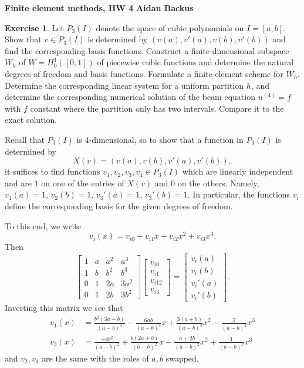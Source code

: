 \documentclass[10pt]{article}
\theoremstyle{definition}
\newtheorem{exer}{Exercise}
\begin{document}
\noindent
\large\textbf{Finite element methods, HW 4} \hfill \textbf{Aidan Backus} \\

\begin{exer}
Let $P_3(I)$ denote the space of cubic polynomials on $I = [a, b]$.
Show that $v \in P_3(I)$ is determined by $(v(a), v'(a), v(b), v'(b))$ and find the corresponding basis functions.
Construct a finite-dimensional subspace $W_h$ of $W = H^1_0([0, 1])$ of piecewise cubic functions and determine the natural degrees of freedom and basis functions.
Formulate a finite-element scheme for $W_h$.
Determine the corresponding linear system for a uniform partition $h$, and determine the corresponding numerical solution of the beam equation $u^{(4)} = f$ with $f$ constant where the partition only has two intervals.
Compare it to the exact solution.
\end{exer}

Recall that $P_3(I)$ is $4$-dimensional, so to show that a function in $P_3(I)$ is determined by
$$X(v) = (v(a), v(b), v'(a), v'(b)),$$
it suffices to find functions $v_1, v_2, v_3, v_4 \in P_3(I)$ which are linearly independent and are $1$ on one of the entries of $X(v)$ and $0$ on the others. Namely, $v_1(a) = 1$, $v_2(b) = 1$, $v_3'(a) = 1$, $v_3'(b) = 1$.
In particular, the functions $v_i$ define the corresponding basis for the given degrees of freedom.

To this end, we write 
$$v_i(x) = v_{i0} + v_{i1}x + v_{i2}x^2 + v_{i3}x^3.$$
Then
$$\begin{bmatrix} 1 & a & a^2 & a^3 \\ 1 & b & b^2 & b^3 \\ 0 & 1 & 2a & 3a^2 \\ 0 & 1 & 2b & 3b^2 \end{bmatrix}\begin{bmatrix}v_{i0} \\ v_{i1} \\ v_{i12} \\ v_{i3}\end{bmatrix} = \begin{bmatrix}v_i(a) \\ v_i(b) \\ v_i'(a) \\ v_i'(b)\end{bmatrix}.$$
Inverting this matrix we see that 
\begin{align*}
    v_1(x) &= \frac{b^2(3a - b)}{(a - b)^3} - \frac{6ab}{(a - b)^3}x + \frac{3(a + b)}{(a - b)^3}x^2 - \frac{2}{(a - b)^3}x^3\\
    v_3(x) &= \frac{-ab^2}{(a - b)^2} + \frac{b(2a + b)}{(a - b)^2}x - \frac{a + 2b}{(a - b)^2}x^2 + \frac{1}{(a - b)^2}x^3
\end{align*}
and $v_2,v_4$ are the same with the roles of $a,b$ swapped.
\end{document}
